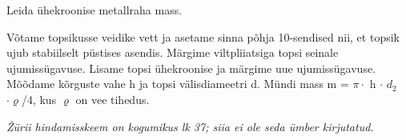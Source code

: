 
Leida ühekroonise metallraha mass.

\hint

\solu
Võtame topsikusse veidike vett ja asetame sinna põhja 10-sendised nii, et topsik ujub stabiilselt püstises asendis. Märgime viltpliiatsiga topsi seinale ujumissügavuse. Lisame topsi ühekroonise ja märgime uue ujumissügavuse. Mõõdame kõrguste vahe h ja topsi välisdiameetri d. Mündi mass m = $\pi \cdot$ h $\cdot$ $d_2$ $\cdot \varrho$/4, kus $\varrho$ on vee tihedus.

\textit{Žürii hindamisskeem on kogumikus lk 37; siia ei ole seda ümber kirjutatud.}
\probend
